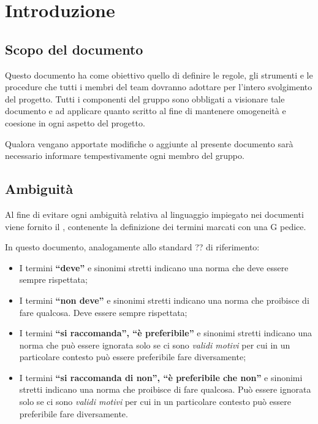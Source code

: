 \section{Introduzione}

\subsection{Scopo del documento}

Questo documento ha come obiettivo quello di definire le regole, gli strumenti e le procedure che tutti i membri del team dovranno adottare per l'intero svolgimento del progetto. Tutti i componenti del gruppo sono obbligati a visionare tale documento e ad applicare quanto scritto al fine di mantenere omogeneità e coesione in ogni aspetto del progetto.

Qualora vengano apportate modifiche o aggiunte al presente documento sarà necessario informare tempestivamente ogni membro del gruppo.

\subsection{Ambiguità}

Al fine di evitare ogni ambiguità relativa al linguaggio impiegato nei documenti viene fornito il \Glossario{}, contenente la definizione dei termini marcati con una G pedice.

In questo documento, analogamente allo standard ?? di riferimento: %
\begin{itemize}
 \item I termini \textbf{``deve''} e sinonimi stretti indicano una norma che deve essere sempre rispettata;
 \item I termini \textbf{``non deve''} e sinonimi stretti indicano una norma che proibisce di fare qualcosa. Deve essere sempre rispettata;
 \item I termini \textbf{``si raccomanda'', ``è preferibile''} e sinonimi stretti indicano una norma che può essere ignorata solo se ci sono \emph{validi motivi} per cui in un particolare contesto può essere preferibile fare diversamente;
 \item I termini \textbf{``si raccomanda di non'', ``è preferibile che non''} e sinonimi stretti indicano una norma che proibisce di fare qualcosa. Può essere ignorata solo se ci sono \emph{validi motivi} per cui in un particolare contesto può essere preferibile fare diversamente.
\end{itemize}
